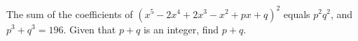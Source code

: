 The sum of the coefficients of $\left(x^5-2x^4+2x^3-x^2+px+q\right)^2$ equals $p^2q^2$, and $p^3+q^3=196$. Given that $p+q$ is an integer, find $p+q$.
